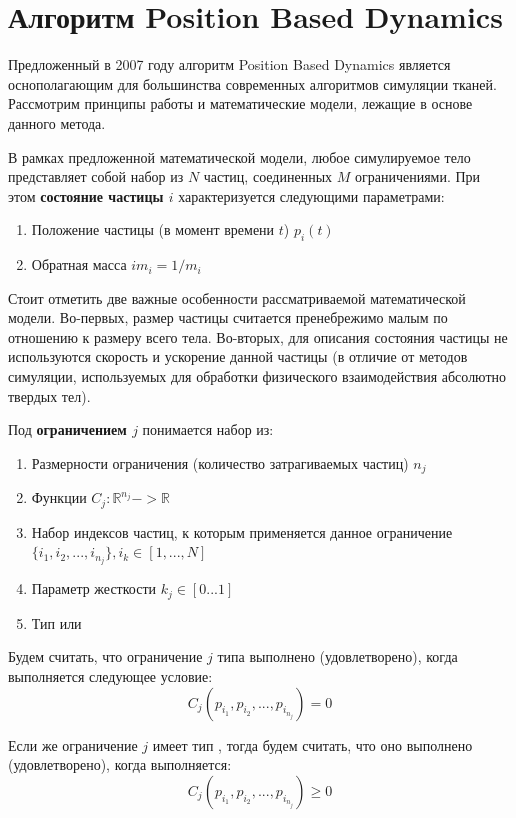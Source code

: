 \section{Алгоритм Position Based Dynamics} \label{ch2:pbd} %
	Предложенный в 2007 году алгоритм Position Based Dynamics\cite{pbd} является оснополагающим для большинства современных алгоритмов симуляции тканей. Рассмотрим принципы работы и математические модели, лежащие в основе данного метода.
	
	В рамках предложенной математической модели, любое симулируемое тело представляет собой набор из $N$ частиц, соединенных $M$ ограничениями. При этом \textbf{состояние частицы $i$} характеризуется следующими параметрами:
	\begin{enumerate}[1.]
		\item Положение частицы (в момент времени $t$) $p_i(t)$
		\item Обратная масса $im_i = 1/m_i$
	\end{enumerate}
	
	Стоит отметить две важные особенности рассматриваемой математической модели. Во-первых, размер частицы считается пренебрежимо малым по отношению к размеру всего тела. Во-вторых, для описания состояния частицы не используются скорость и ускорение данной частицы (в отличие от методов симуляции, используемых для обработки физического взаимодействия абсолютно твердых тел).
	
	Под \textbf{ограничением $j$} понимается набор из:
	\begin{enumerate}[1.]
		\item Размерности ограничения (количество затрагиваемых частиц) $n_j$
		\item Функции $C_j: \mathbb{R}^{n_j}->\mathbb{R}$
		\item Набор индексов частиц, к которым применяется данное ограничение $\{i_1, i_2, ..., i_{n_j}\}, i_k \in [1, ..., N]$
		\item Параметр жесткости $k_j \in [0...1]$
		\item Тип  или 
	\end{enumerate}
	
	Будем считать, что ограничение $j$ типа  выполнено (удовлетворено), когда выполняется следующее условие:
	\begin{equation} \label{eq:constraint-eq}
		C_j(p_{i_1}, p_{i_2}, ..., p_{i_{n_j}}) = 0
	\end{equation} 
	
	Если же ограничение $j$ имеет тип , тогда будем считать, что оно выполнено (удовлетворено), когда выполняется:
	\begin{equation} \label{eq:constraint-neq}
		C_j(p_{i_1}, p_{i_2}, ..., p_{i_{n_j}}) \ge 0
	\end{equation} 
	
